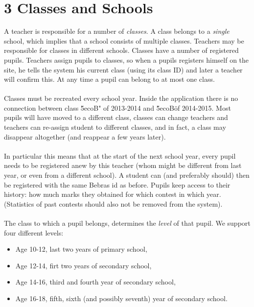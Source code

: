 
\section*{3 Classes and Schools}

A teacher is responsible for a number of \emph{classes}. A class belongs to a \emph{single} school, which implies that a school consists of multiple classes. Teachers may be responsible for classes in different schools. Classes have a number of registered pupils. Teachers assign pupils to classes, so when a pupils registers himself on the site, he tells the system his current class (using its class ID) and later a teacher will confirm this. At any time a pupil can belong to at most one class. \\
\\
Classes must be recreated every school year. Inside the application there is no connection between class \"5ecoB" of 2013-2014 and \"5ecoB\" of 2014-2015. Most pupils will have moved to a different class, classes can change teachers and teachers can re-assign student to different classes, and in fact, a class may disappear altogether (and reappear a few years later).\\
\\
In particular this means that at the start of the next school year, every pupil needs to be registered anew by this teacher (whom might be different from last year, or even from a different school). A student can (and preferably should) then be registered with the same Bebras id as before. Pupils keep access to their history: how much marks they obtained for which contest in which year. \\
(Statistics of past contests should also not be removed from the system).\\
\\
The class to which a pupil belongs, determines the \emph{level} of that pupil. We support four different levels:
\begin{itemize}
\item Age 10-12, last two years of primary school,
\item Age 12-14, firt two years of secondary school,
\item Age 14-16, third and fourth year of secondary school,
\item Age 16-18, fifth, sixth (and possibly seventh) year of secondary school.
\end{itemize}
